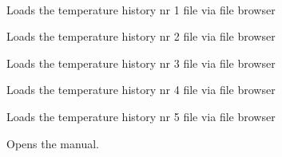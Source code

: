 \documentclass[letterpaper,10pt,english]{sphinxmanual}
\begin{document}
\begin{fulllineitems}
\label{GUI:PKPgui.Ui_PKP}~

\begin{fulllineitems}
\label{GUI:PKPgui.Ui_PKP.LoadTtFile1}
Loads the temperature history nr 1 file via file browser

\end{fulllineitems}


\begin{fulllineitems}
\label{GUI:PKPgui.Ui_PKP.LoadTtFile2}
Loads the temperature history nr 2 file via file browser

\end{fulllineitems}


\begin{fulllineitems}
\label{GUI:PKPgui.Ui_PKP.LoadTtFile3}
Loads the temperature history nr 3 file via file browser

\end{fulllineitems}


\begin{fulllineitems}
\label{GUI:PKPgui.Ui_PKP.LoadTtFile4}
Loads the temperature history nr 4 file via file browser

\end{fulllineitems}


\begin{fulllineitems}
\label{GUI:PKPgui.Ui_PKP.LoadTtFile5}
Loads the temperature history nr 5 file via file browser

\end{fulllineitems}


\begin{fulllineitems}
\label{GUI:PKPgui.Ui_PKP.OpenManual}
Opens the manual.


\end{fulllineitems}
\end{fulllineitems}
\end{document}

